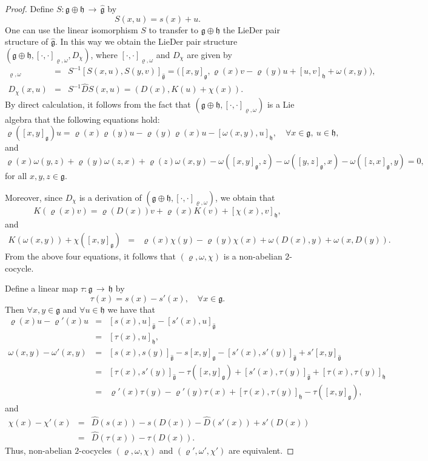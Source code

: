 \documentclass[12pt]{amsart}
\newcommand{\lon }{\,\rightarrow\,}
\newcommand{\g}{\mathfrak g}
\newcommand{\h}{\mathfrak h}
\begin{document}
\begin{proof}
Define $S:\g\oplus \h\lon\hat{\g}$ by
$$
S(x, u)=s(x)+u.
$$
One can use the linear isomorphism $S$ to transfer to $\g\oplus\h$ the {\rm LieDer} pair structure of $\hat{\g}$. In this way we obtain the {\rm LieDer} pair structure $(\g\oplus\h, [\cdot,\cdot]_{\varrho,\omega}, D_{\chi})$, where $[\cdot,\cdot]_{\varrho,\omega}$ and $D_{\chi}$ are given by
\begin{eqnarray*}
[(x, u), (y, v)]_{\varrho,\omega}&=&S^{-1}[S(x, u), S(y, v)]_{\hat{\g}}=\Big([x, y]_\g, \varrho(x)v-\varrho(y)u+[u, v]_\h+\omega(x,y)\Big),\\
D_{\chi}(x, u)&=&S^{-1}\hat{D}S(x, u)=(D(x), K(u)+\chi(x)).
\end{eqnarray*}
By direct calculation, it follows from the fact that $(\g\oplus\h, [\cdot, \cdot]_{\varrho,\omega})$ is a Lie algebra that the following equations hold:
\begin{equation*}\label{eqrep1}
\varrho([x, y]_\g)u=\varrho(x)\varrho(y)u-\varrho(y)\varrho(x)u-[\omega(x, y), u]_\h,\quad \forall x\in\g,~u\in\h,
\end{equation*}
and
\begin{equation*}\label{eqrep2}
\varrho(x)\omega(y, z)+\varrho(y)\omega(z, x)+\varrho(z)\omega(x, y)-\omega([x, y]_\g, z)-\omega([y, z]_\g, x)-\omega([z, x]_\g, y)=0,
\end{equation*}
for all $x, y, z\in\g$.

Moreover, since $D_{\chi}$ is a derivation of $(\g\oplus\h, [\cdot, \cdot]_{\varrho,\omega})$, we obtain that
\begin{equation*}\label{eqrep3}
K(\varrho(x)v)=\varrho(D(x))v+\varrho(x)K(v)+[\chi(x), v]_\h,
\end{equation*}
and
\begin{eqnarray*}\label{eqrep4}
K(\omega(x, y))+\chi([x, y]_\g)
&=&\varrho(x)\chi(y)-\varrho(y)\chi(x)+\omega(D(x), y)+\omega(x, D(y)).
\end{eqnarray*}
From the above four equations, it follows that $(\varrho, \omega, \chi)$ is a non-abelian $2$-cocycle.

Define a linear map $\tau:\g\lon\h$ by
$$
\tau(x)=s(x)-s'(x), \quad \forall x\in\g.
$$
Then $\forall x, y\in\g$ and $\forall u\in\h$ we have that
\begin{eqnarray*}
\varrho(x)u-\varrho'(x)u&=&[s(x), u]_{\hat{\g}}-[s'(x), u]_{\hat{\g}}\\
&=&[\tau(x), u]_{\h},\\
\omega(x, y)-\omega'(x, y)&=&[s(x), s(y)]_{\hat{\g}}-s[x, y]_{\g}-[s'(x), s'(y)]_{\hat{\g}}+s'[x, y]_{\hat{\g}}\\
&=&[\tau(x), s'(y)]_{\hat{\g}}-\tau([x, y]_\g)+[s'(x), \tau(y)]_{\hat{\g}}+[\tau(x), \tau(y)]_\h\\
&=&\varrho'(x)\tau(y)-\varrho'(y)\tau(x)+[\tau(x), \tau(y)]_\h-\tau([x, y]_\g),
\end{eqnarray*}
and
\begin{eqnarray*}
\chi(x)-\chi'(x)&=&\hat{D}(s(x))-s(D(x))-\hat{D}(s'(x))+s'(D(x))\\
&=&\hat{D}(\tau(x))-\tau(D(x)).
\end{eqnarray*}
Thus, non-abelian $2$-cocycles $(\varrho, \omega, \chi)$ and $(\varrho', \omega', \chi')$ are equivalent.
\end{proof}
\end{document}
